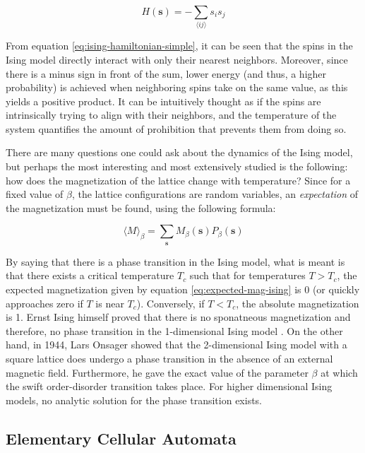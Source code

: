 \documentclass[12pt]{article}
\begin{document}
\begin{equation}
H(\boldsymbol{s}) = - \sum_{\langle ij \rangle} s_i s_j
\label{eq:ising-hamiltonian-simple}
\end{equation}

From equation \ref{eq:ising-hamiltonian-simple}, it can be seen that the spins in the Ising model directly interact with only their nearest neighbors. Moreover, since there is a minus sign in front of the sum, lower energy (and thus, a higher probability) is achieved when neighboring spins take on the same value, as this yields a positive product. It can be intuitively thought as if the spins are intrinsically trying to align with their neighbors, and the temperature of the system quantifies the amount of prohibition that prevents them from doing so. 

There are many questions one could ask about the dynamics of the Ising model, but perhaps the most interesting and most extensively studied is the following: how does the magnetization of the lattice change with temperature? Since for a fixed value of $\beta$, the lattice configurations are random variables, an \textit{expectation} of the magnetization must be found, using the following formula:

\begin{equation}
\langle M \rangle_\beta = \sum_{\boldsymbol{s}} M_\beta(\boldsymbol{s}) P_\beta(\boldsymbol{s})
\label{eq:expected-mag-ising}
\end{equation}

By saying that there is a phase transition in the Ising model, what is meant is that there exists a critical temperature $T_c$ such that for temperatures $T > T_c$, the expected magnetization given by equation \ref{eq:expected-mag-ising} is 0 (or quickly approaches zero if $T$ is near $T_c$). Conversely, if $T < T_c$, the absolute magnetization is 1. Ernst Ising himself proved that there is no sponatneous magnetization and therefore, no phase transition in the 1-dimensional Ising model \cite{Ising1925}. On the other hand, in 1944, Lars Onsager showed \cite{lars-onsanger} that the 2-dimensional Ising model with a square lattice does undergo a phase transition in the absence of an external magnetic field. Furthermore, he gave the exact value of the parameter $\beta$ at which the swift order-disorder transition takes place. For higher dimensional Ising models, no analytic solution for the phase transition exists. 

\newpage
\subsection{Elementary Cellular Automata}
\end{document}
